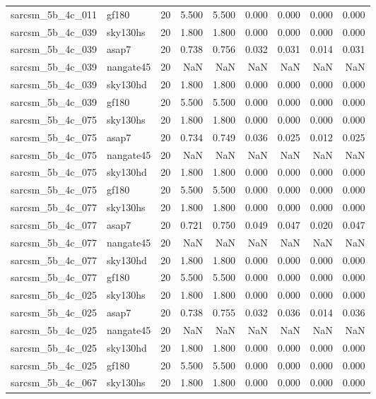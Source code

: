 \begin{tabular}{llrrrrrrr}
sarcsm\_5b\_4c\_011 & gf180 & 20 & 5.500 & 5.500 & 0.000 & 0.000 & 0.000 & 0.000 \\
sarcsm\_5b\_4c\_039 & sky130hs & 20 & 1.800 & 1.800 & 0.000 & 0.000 & 0.000 & 0.000 \\
sarcsm\_5b\_4c\_039 & asap7 & 20 & 0.738 & 0.756 & 0.032 & 0.031 & 0.014 & 0.031 \\
sarcsm\_5b\_4c\_039 & nangate45 & 20 & NaN & NaN & NaN & NaN & NaN & NaN \\
sarcsm\_5b\_4c\_039 & sky130hd & 20 & 1.800 & 1.800 & 0.000 & 0.000 & 0.000 & 0.000 \\
sarcsm\_5b\_4c\_039 & gf180 & 20 & 5.500 & 5.500 & 0.000 & 0.000 & 0.000 & 0.000 \\
sarcsm\_5b\_4c\_075 & sky130hs & 20 & 1.800 & 1.800 & 0.000 & 0.000 & 0.000 & 0.000 \\
sarcsm\_5b\_4c\_075 & asap7 & 20 & 0.734 & 0.749 & 0.036 & 0.025 & 0.012 & 0.025 \\
sarcsm\_5b\_4c\_075 & nangate45 & 20 & NaN & NaN & NaN & NaN & NaN & NaN \\
sarcsm\_5b\_4c\_075 & sky130hd & 20 & 1.800 & 1.800 & 0.000 & 0.000 & 0.000 & 0.000 \\
sarcsm\_5b\_4c\_075 & gf180 & 20 & 5.500 & 5.500 & 0.000 & 0.000 & 0.000 & 0.000 \\
sarcsm\_5b\_4c\_077 & sky130hs & 20 & 1.800 & 1.800 & 0.000 & 0.000 & 0.000 & 0.000 \\
sarcsm\_5b\_4c\_077 & asap7 & 20 & 0.721 & 0.750 & 0.049 & 0.047 & 0.020 & 0.047 \\
sarcsm\_5b\_4c\_077 & nangate45 & 20 & NaN & NaN & NaN & NaN & NaN & NaN \\
sarcsm\_5b\_4c\_077 & sky130hd & 20 & 1.800 & 1.800 & 0.000 & 0.000 & 0.000 & 0.000 \\
sarcsm\_5b\_4c\_077 & gf180 & 20 & 5.500 & 5.500 & 0.000 & 0.000 & 0.000 & 0.000 \\
sarcsm\_5b\_4c\_025 & sky130hs & 20 & 1.800 & 1.800 & 0.000 & 0.000 & 0.000 & 0.000 \\
sarcsm\_5b\_4c\_025 & asap7 & 20 & 0.738 & 0.755 & 0.032 & 0.036 & 0.014 & 0.036 \\
sarcsm\_5b\_4c\_025 & nangate45 & 20 & NaN & NaN & NaN & NaN & NaN & NaN \\
sarcsm\_5b\_4c\_025 & sky130hd & 20 & 1.800 & 1.800 & 0.000 & 0.000 & 0.000 & 0.000 \\
sarcsm\_5b\_4c\_025 & gf180 & 20 & 5.500 & 5.500 & 0.000 & 0.000 & 0.000 & 0.000 \\
sarcsm\_5b\_4c\_067 & sky130hs & 20 & 1.800 & 1.800 & 0.000 & 0.000 & 0.000 & 0.000 \\

\end{tabular}
